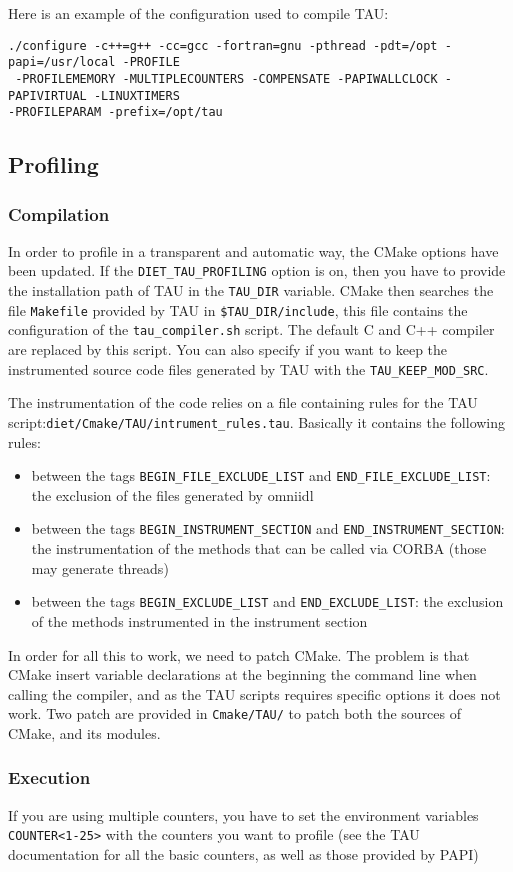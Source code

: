 Here is an example of the configuration used to compile TAU:
\begin{verbatim}
./configure -c++=g++ -cc=gcc -fortran=gnu -pthread -pdt=/opt -papi=/usr/local -PROFILE
 -PROFILEMEMORY -MULTIPLECOUNTERS -COMPENSATE -PAPIWALLCLOCK -PAPIVIRTUAL -LINUXTIMERS
-PROFILEPARAM -prefix=/opt/tau
\end{verbatim}


\subsection{Profiling \diet}

\subsubsection{Compilation}

In order to profile \diet in a transparent and automatic way, the
CMake options have been updated. If the \texttt{DIET\_TAU\_PROFILING}
option is on, then you have to provide the installation path of TAU in
the \texttt{TAU\_DIR} variable. CMake then searches the file
\texttt{Makefile} provided by TAU in \texttt{\$TAU\_DIR/include}, this
file contains the configuration of the \texttt{tau\_compiler.sh}
script. The default C and C++ compiler are replaced by this script.
You can also specify if you want to keep the instrumented source code
files generated by TAU with the \texttt{TAU\_KEEP\_MOD\_SRC}.

The instrumentation of the code relies on a file containing rules for
the TAU script:\linebreak \texttt{diet/Cmake/TAU/intrument\_rules.tau}. Basically
it contains the following rules:
\begin{itemize}
  \item between the tags \texttt{BEGIN\_FILE\_EXCLUDE\_LIST} and
    \texttt{END\_FILE\_EXCLUDE\_LIST}: the exclusion of the files
    generated by omniidl
  \item between the tags \texttt{BEGIN\_INSTRUMENT\_SECTION} and
    \texttt{END\_INSTRUMENT\_SECTION}: the instrumentation of the
    methods that can be called via CORBA (those may generate threads)
  \item between the tags \texttt{BEGIN\_EXCLUDE\_LIST} and
    \texttt{END\_EXCLUDE\_LIST}: the exclusion of the methods
    instrumented in the instrument section
\end{itemize}

In order for all this to work, we need to patch CMake. The problem is
that CMake insert variable declarations at the beginning the command line when
calling the compiler, and as the TAU scripts requires specific options
it does not work. Two patch are provided in \texttt{Cmake/TAU/} to
patch both the sources of CMake, and its modules.


\subsubsection{Execution}

If you are using multiple counters, you have to set the environment
variables \texttt{COUNTER<1-25>} with the counters you want to profile
(see the TAU documentation for all the basic counters, as well as
those provided by PAPI)
